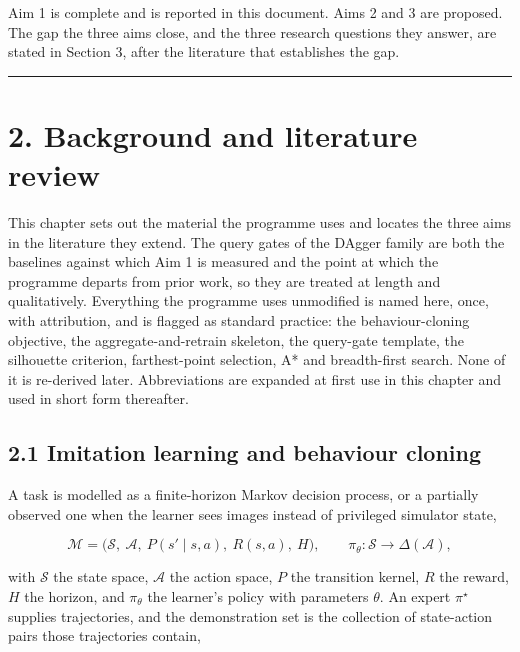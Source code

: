 \documentclass[
  11pt,
]{article}
\begin{document}
Aim 1 is complete and is reported in this document. Aims 2 and 3 are
proposed. The gap the three aims close, and the three research questions
they answer, are stated in Section 3, after the literature that
establishes the gap.

\begin{center}\rule{0.5\linewidth}{0.5pt}\end{center}

\hypertarget{background-and-literature-review}{%
\section{2. Background and literature
review}\label{background-and-literature-review}}

This chapter sets out the material the programme uses and locates the
three aims in the literature they extend. The query gates of the DAgger
family are both the baselines against which Aim 1 is measured and the
point at which the programme departs from prior work, so they are
treated at length and qualitatively. Everything the programme uses
unmodified is named here, once, with attribution, and is flagged as
standard practice: the behaviour-cloning objective, the
aggregate-and-retrain skeleton, the query-gate template, the silhouette
criterion, farthest-point selection, A* and breadth-first search. None
of it is re-derived later. Abbreviations are expanded at first use in
this chapter and used in short form thereafter.

\hypertarget{imitation-learning-and-behaviour-cloning}{%
\subsection{2.1 Imitation learning and behaviour
cloning}\label{imitation-learning-and-behaviour-cloning}}

A task is modelled as a finite-horizon Markov decision process, or a
partially observed one when the learner sees images instead of
privileged simulator state,

\[\mathcal{M} = \big(\mathcal{S},\ \mathcal{A},\ P(s' \mid s, a),\ R(s,a),\ H\big),
\qquad
\pi_\theta : \mathcal{S} \to \Delta(\mathcal{A}),\]

with \(\mathcal{S}\) the state space, \(\mathcal{A}\) the action space,
\(P\) the transition kernel, \(R\) the reward, \(H\) the horizon, and
\(\pi_\theta\) the learner's policy with parameters \(\theta\). An
expert \(\pi^\star\) supplies trajectories, and the demonstration set is
the collection of state-action pairs those trajectories contain,
\end{document}

